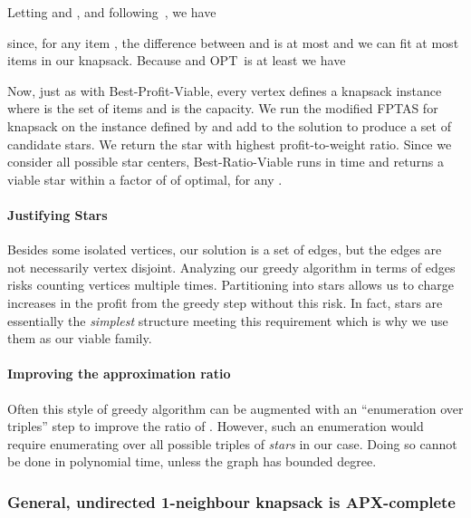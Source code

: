 \documentclass[12pt]{article}
\newcommand{\OPT}{\ensuremath{\mathrm{OPT}\xspace}}
\begin{document}
Letting  and , and following~\cite{vazirani}, we have

since, for any item , the difference between  and  is at most  and we can fit at most  items in our knapsack.  Because  and \OPT \ is at least  we have

Now, just as with {\sc Best-Profit-Viable}, every vertex  defines a knapsack instance where  is the set of items and  is the capacity.  We run the modified FPTAS for knapsack on the instance defined by  and add  to the solution to produce a set of candidate stars.  We return the star with highest profit-to-weight ratio.  Since we consider all possible star centers, {\sc Best-Ratio-Viable} runs in  time and returns a viable star within a factor of  of optimal, for any .

\paragraph{Justifying Stars}

Besides some isolated vertices, our solution is a set of edges, but
the edges are not necessarily vertex disjoint.  Analyzing our greedy
algorithm in terms of edges risks counting vertices multiple times.
Partitioning into stars allows us to charge increases in the profit
from the greedy step without this risk.  In fact, stars are
essentially the {\em simplest} structure meeting this requirement
which is why we use them as our viable family.

\paragraph{Improving the approximation ratio}

Often this style of greedy algorithm can be augmented with an
``enumeration over triples'' step to improve the ratio of
.  However, such an enumeration
would require enumerating over all possible triples of {\em stars} in
our case.  Doing so cannot be done in polynomial time, unless the
graph has bounded degree.



\subsubsection{General, undirected 1-neighbour knapsack is APX-complete} \label{sec:apx-hardness}
\end{document}
